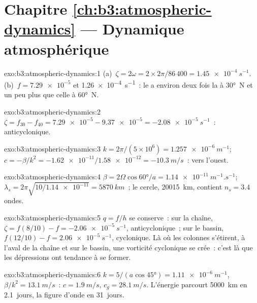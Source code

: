 \section*{Chapitre \ref{ch:b3:atmospheric-dynamics} --- Dynamique atmosphérique}

\begin{solution}{exo:b3:atmospheric-dynamics:1}
(a)~$\zeta = 2\omega = 2\times2\pi/86\,400 = \qty{1.45e-4}{s^{-1}}$.
(b)~$f = \num{7.29e-5}$ et \qty{1.26e-4}{s^{-1}}~: le  a environ
deux fois la  à \ang{30}~N et un peu plus que celle à
\ang{60}~N.
\end{solution}

\begin{solution}{exo:b3:atmospheric-dynamics:2}
$\zeta = f_{30} - f_{40} = \num{7.29e-5} - \num{9.37e-5} =
\qty{-2.08e-5}{s^{-1}}$~: anticyclonique.
\end{solution}

\begin{solution}{exo:b3:atmospheric-dynamics:3}
$k = 2\pi/(5\times10^6) = \qty{1.257e-6}{m^{-1}}$; $c = -\beta/k^2 =
-\num{1.62e-11}/\num{1.58e-12} = \qty{-10.3}{m/s}$~: vers l'ouest.
\end{solution}

\begin{solution}{exo:b3:atmospheric-dynamics:4}
$\beta = 2\Omega\cos\ang{60}/a = \qty{1.14e-11}{m^{-1}.s^{-1}}$;
$\lambda_s = 2\pi\sqrt{10/\num{1.14e-11}} = \qty{5870}{km}$~; le cercle,
\qty{20015}{km}, contient $n_s = 3.4$ ondes.
\end{solution}

\begin{solution}{exo:b3:atmospheric-dynamics:5}
$q = f/h$ se conserve~: sur la chaîne, $\zeta = f(8/10) - f =
\qty{-2.06e-5}{s^{-1}}$, anticyclonique~; sur le bassin, $f(12/10) - f =
\qty{+2.06e-5}{s^{-1}}$, cyclonique. Là où les colonnes s'étirent, à l'aval
de la chaîne et sur le bassin, une vorticité cyclonique se crée~: c'est là que
les dépressions ont tendance à se former.
\end{solution}

\begin{solution}{exo:b3:atmospheric-dynamics:6}
$k = 5/(a\cos\ang{45}) = \qty{1.11e-6}{m^{-1}}$, $\beta/k^2 =
\qty{13.1}{m/s}$~: $c = \qty{1.9}{m/s}$, $c_g = \qty{28.1}{m/s}$. L'énergie
parcourt \qty{5000}{km} en \num{2.1}~jours, la figure d'onde en \num{31}~jours.
\end{solution}

